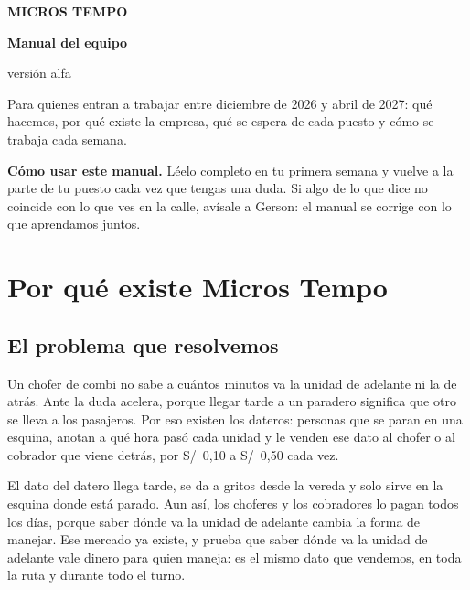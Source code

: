 \documentclass[a4paper]{article}
\begin{document}
\begin{titlepage}
\thispagestyle{empty}
\vspace*{1.2cm}
{\small\bfseries\color{marca}\MakeUppercase{Micros Tempo}}\par\vspace{14pt}
{\fontsize{34}{38}\selectfont\bfseries Manual del equipo}\par\vspace{6pt}
{\fontsize{20}{24}\selectfont\color{tinta2} versión alfa}\par\vspace{18pt}
\begin{minipage}{0.84\linewidth}\large\color{tinta2}
Para quienes entran a trabajar entre diciembre de 2026 y abril de 2027: qué hacemos, por qué existe la empresa, qué se espera de cada puesto y cómo se trabaja cada semana.
\end{minipage}
\vfill
\begin{nota}
\textbf{Cómo usar este manual.} Léelo completo en tu primera semana y vuelve a la parte de tu puesto cada vez que tengas una duda. Si algo de lo que dice no coincide con lo que ves en la calle, avísale a Gerson: el manual se corrige con lo que aprendamos juntos.
\end{nota}
\end{titlepage}

{\setcounter{tocdepth}{1}\tableofcontents}
\newpage

\section{Por qué existe Micros Tempo}

\subsection{El problema que resolvemos}

Un chofer de combi no sabe a cuántos minutos va la unidad de adelante ni la de atrás. Ante la duda acelera, porque llegar tarde a un paradero significa que otro se lleva a los pasajeros. Por eso existen los dateros: personas que se paran en una esquina, anotan a qué hora pasó cada unidad y le venden ese dato al chofer o al cobrador que viene detrás, por S/~0,10 a S/~0,50 cada vez.

El dato del datero llega tarde, se da a gritos desde la vereda y solo sirve en la esquina donde está parado. Aun así, los choferes y los cobradores lo pagan todos los días, porque saber dónde va la unidad de adelante cambia la forma de manejar. Ese mercado ya existe, y prueba que saber dónde va la unidad de adelante vale dinero para quien maneja: es el mismo dato que vendemos, en toda la ruta y durante todo el turno.
\end{document}
